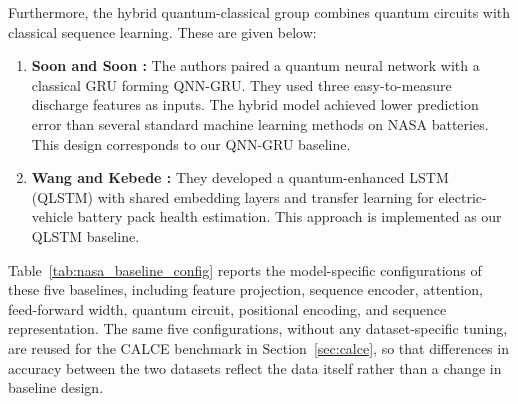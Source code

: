 \documentclass[a4paper,fleqn]{cas-sc}
\begin{document}
Furthermore, the hybrid quantum-classical group combines quantum circuits with classical sequence learning. These are given below:
\begin{enumerate}[label=(\roman*)]
  \item \textbf{Soon and Soon \citep{soon2025hybrid}:} The authors paired a quantum neural network with a classical GRU forming QNN-GRU. They used three easy-to-measure discharge features as inputs. The hybrid model achieved lower prediction error than several standard machine learning methods on NASA batteries. This design corresponds to our QNN-GRU baseline.
  \item \textbf{Wang and Kebede \citep{wang2026prediction}:} They developed a quantum-enhanced LSTM (QLSTM) with shared embedding layers and transfer learning for electric-vehicle battery pack health estimation. 
  This approach is implemented as our QLSTM baseline.
\end{enumerate}

Table~\ref{tab:nasa_baseline_config} reports the model-specific configurations of these five baselines, including feature projection, sequence encoder, attention, feed-forward width, quantum circuit, positional encoding, and sequence representation. The same five configurations, without any dataset-specific tuning, are reused for the CALCE benchmark in Section~\ref{sec:calce}, so that differences in accuracy between the two datasets reflect the data itself rather than a change in baseline design.
\end{document}
